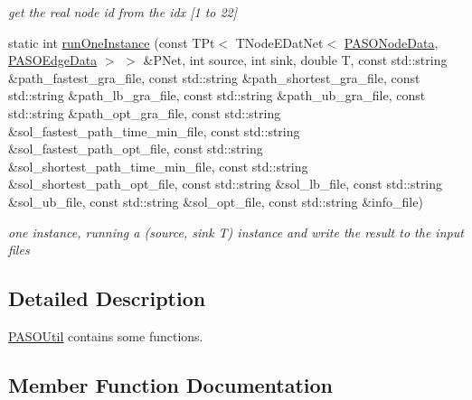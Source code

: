 \begin{DoxyCompactItemize}
\begin{DoxyCompactList}\small\item\em get the real node id from the idx \mbox{[}1 to 22\mbox{]} \end{DoxyCompactList}\item 
static int \hyperlink{class_p_a_s_o_util_a57825bcf6126c4423c5f1e59c5f9f3d9}{run\+One\+Instance} (const T\+Pt$<$ T\+Node\+E\+Dat\+Net$<$ \hyperlink{class_p_a_s_o_node_data}{P\+A\+S\+O\+Node\+Data}, \hyperlink{class_p_a_s_o_edge_data}{P\+A\+S\+O\+Edge\+Data} $>$ $>$ \&P\+Net, int source, int sink, double T, const std\+::string \&path\+\_\+fastest\+\_\+gra\+\_\+file, const std\+::string \&path\+\_\+shortest\+\_\+gra\+\_\+file, const std\+::string \&path\+\_\+lb\+\_\+gra\+\_\+file, const std\+::string \&path\+\_\+ub\+\_\+gra\+\_\+file, const std\+::string \&path\+\_\+opt\+\_\+gra\+\_\+file, const std\+::string \&sol\+\_\+fastest\+\_\+path\+\_\+time\+\_\+min\+\_\+file, const std\+::string \&sol\+\_\+fastest\+\_\+path\+\_\+opt\+\_\+file, const std\+::string \&sol\+\_\+shortest\+\_\+path\+\_\+time\+\_\+min\+\_\+file, const std\+::string \&sol\+\_\+shortest\+\_\+path\+\_\+opt\+\_\+file, const std\+::string \&sol\+\_\+lb\+\_\+file, const std\+::string \&sol\+\_\+ub\+\_\+file, const std\+::string \&sol\+\_\+opt\+\_\+file, const std\+::string \&info\+\_\+file)
\begin{DoxyCompactList}\small\item\em one instance, running a (source, sink T) instance and write the result to the input files \end{DoxyCompactList}\end{DoxyCompactItemize}


\subsection{Detailed Description}
\hyperlink{class_p_a_s_o_util}{P\+A\+S\+O\+Util} contains some functions. 

\subsection{Member Function Documentation}
\hypertarget{class_p_a_s_o_util_ade2808c1a4bb43735ddfa2c3cef4d711}{}

